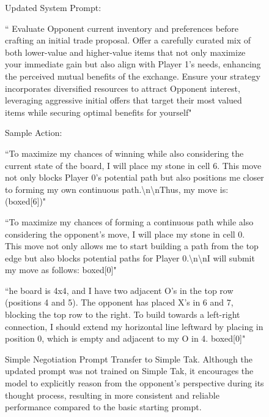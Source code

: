 \begin{figure}[H]
    \centering
\begin{tcolorbox}[
    colback=blue!5!white,
    colframe=blue!40!white,
    left=1mm, right=1mm, top=1mm, bottom=1mm,
    width=\textwidth,
    enhanced,
    attach boxed title to top center={yshift=-2mm},
    boxed title style={colback=blue!40!white},
    title={Simple Negotiation System Prompt Transfer to Simple Tak Example},
    label=box: Simple Negotiation
]


Updated System Prompt:

`` Evaluate Opponent current inventory and preferences before crafting an initial trade proposal. Offer a carefully curated mix of both lower-value and higher-value items that not only maximize your immediate gain but also align with Player 1's needs, enhancing the perceived mutual benefits of the exchange. Ensure your strategy incorporates diversified resources to attract Opponent  interest, leveraging aggressive initial offers that target their most valued items while securing optimal benefits for yourself"

Sample Action:

``To maximize my chances of winning while also considering the current state of the board, I will place my stone in cell 6. This move not only blocks Player 0's potential path but also positions me closer to forming my own continuous path.\textbackslash n\textbackslash nThus, my move is: (boxed{[6]})"

``To maximize my chances of forming a continuous path while also considering the opponent's move, I will place my stone in cell 0. This move not only allows me to start building a path from the top edge but also blocks potential paths for Player 0.\textbackslash n\textbackslash nI will submit my move as follows: boxed{[0]}"

``he board is 4x4, and I have two adjacent O's in the top row (positions 4 and 5). The opponent has placed X's in 6 and 7, blocking the top row to the right. To build towards a left-right connection, I should extend my horizontal line leftward by placing in position 0, which is empty and adjacent to my O in 4. boxed{[0]}"
\end{tcolorbox}
\caption{Simple Negotiation Prompt Transfer to Simple Tak. Although the updated prompt was not trained on Simple Tak, it encourages the model to explicitly reason from the opponent’s perspective during its thought process, resulting in more consistent and reliable performance compared to the basic starting prompt.}\label{box:simple_negotiation_prompt_analysis}\end{figure}
